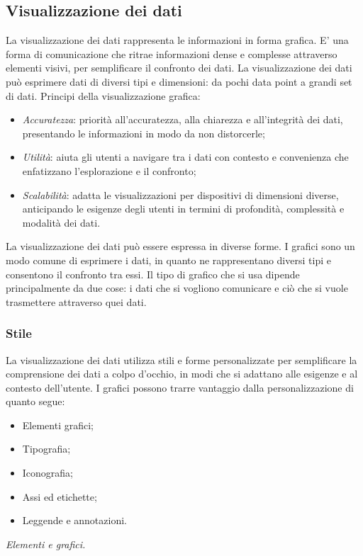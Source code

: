 \documentclass[12pt, a4paper]{report}
\begin{document}
	\subsection{Visualizzazione dei dati}
	La visualizzazione dei dati rappresenta le informazioni in forma grafica. E’ una forma di comunicazione che ritrae informazioni dense e complesse attraverso elementi visivi, per semplificare il confronto dei dati. La visualizzazione dei dati può esprimere dati di diversi tipi e dimensioni: da pochi data point a grandi set di dati. Principi della visualizzazione grafica:
	\begin{itemize}
		\item \textit{Accuratezza}: priorità all'accuratezza, alla chiarezza e all'integrità dei dati, presentando le informazioni in modo da non distorcerle;
		\item \textit{Utilità}: aiuta gli utenti a navigare tra i dati con contesto e convenienza che enfatizzano l'esplorazione e il confronto;
		\item \textit{Scalabilità}: adatta le visualizzazioni per dispositivi di dimensioni diverse, anticipando le esigenze degli utenti in termini di profondità, complessità e modalità dei dati.
	\end{itemize}
	La visualizzazione dei dati può essere espressa in diverse forme. I grafici sono un modo comune di esprimere i dati, in quanto ne rappresentano diversi tipi e consentono il confronto tra essi. Il tipo di grafico che si usa dipende principalmente da due cose: i dati che si vogliono comunicare e ciò che si vuole trasmettere attraverso quei dati.
	\subsubsection{Stile}
	La visualizzazione dei dati utilizza stili e forme personalizzate per semplificare la comprensione dei dati a colpo d'occhio, in modi che si adattano alle esigenze e al contesto dell'utente. I grafici possono trarre vantaggio dalla personalizzazione di quanto segue:
	\begin{itemize}
		\item Elementi grafici;
		\item Tipografia;
		\item Iconografia;
		\item Assi ed etichette;
		\item Leggende e annotazioni.
	\end{itemize}

	\textit{Elementi e grafici.}
\end{document}

